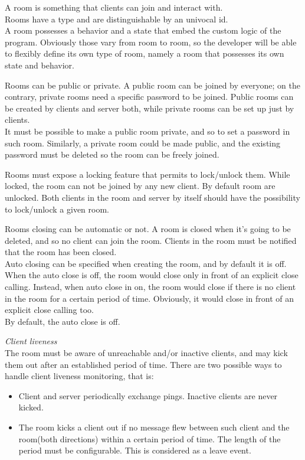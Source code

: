 A room is something that clients can join and interact with.
\\
Rooms have a type and are distinguishable by an univocal id.
\\
A room possesses a behavior and a state that embed the custom logic of the program. Obviously those vary from room to room, so the developer will be able to flexibly define its own type of room, namely a room that possesses its own state and behavior.

\bigskip
Rooms can be public or private. A public room can be joined by everyone; on the contrary, private rooms need a specific password to be joined.
Public rooms can be created by clients and server both, while private rooms can be set up just by clients.  
\\
It must be possible to make a public room private, and so to set a password in such room. Similarly, a private room could be made public, and the existing password must be deleted so the room can be freely joined.  

\bigskip
Rooms must expose a locking feature that permits to lock/unlock them. While locked, the room can not be joined by any new client. By default room are unlocked.
Both clients in the room and server by itself should have the possibility to lock/unlock a given room.

\bigskip
Rooms closing can be automatic or not. A room is closed when it's going to be deleted, and so no client can join the room. Clients in the room must be notified that the room has been closed. 
\\
Auto closing can be specified when creating the room, and by default it is off.
\\
When the auto close is off, the room would close only in front of an explicit close calling.
Instead, when auto close in on, the room would close if there is no client in the room for a certain period of time. Obviously, it would close in front of an explicit close calling too.
\\
By default, the auto close is off.

\bigskip
\textit{Client liveness} 
\\
The room must be aware of unreachable and/or inactive clients, and may kick them out after an established period of time. There are two possible ways to handle client liveness monitoring, that is:
\begin{itemize}
\item Client and server periodically exchange pings. Inactive clients are never kicked.  
\item The room kicks a client out if no message flew between such client and the room(both directions) within a certain period of time. The length of the period must be configurable. This is considered as a leave event.
\end{itemize}

